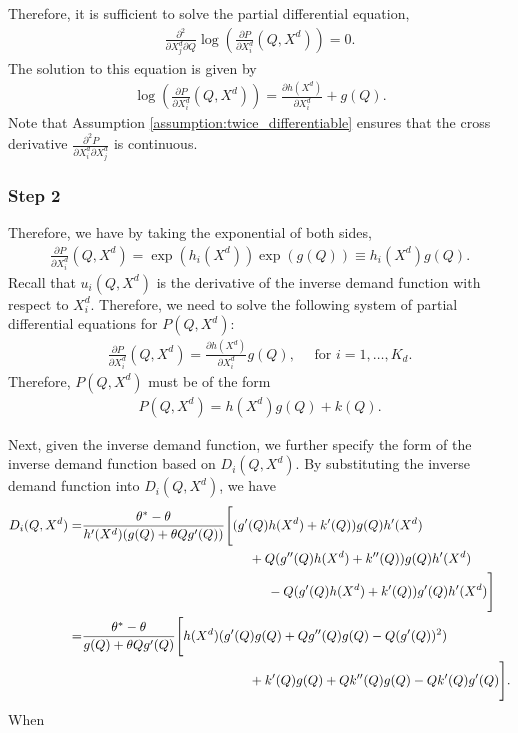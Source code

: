 \documentclass[11pt, a4paper]{article}
\theoremstyle{remark}
\begin{document}
Therefore, it is sufficient to solve the partial differential equation,
\begin{align}
    \frac{\partial^2 }{\partial X^{d}_j \partial Q}\log \left(\frac{\partial P}{\partial X^{d}_i}(Q, X^{d})\right) = 0.
\end{align}
The solution to this equation is given by
\begin{align}
    \log \left(\frac{\partial P}{\partial X^{d}_i}(Q, X^{d})\right) = \frac{\partial h(X^{d})}{\partial X^{d}_i}+ g(Q).
\end{align}
Note that Assumption \ref{assumption:twice_differentiable} ensures that the cross derivative $\frac{\partial^2 P}{\partial X^{d}_i \partial X^{d}_j}$ is continuous.



\subsubsection*{Step 2}

Therefore, we have by taking the exponential of both sides,
\begin{align}
    \frac{\partial P}{\partial X^{d}_i}(Q, X^{d}) = \exp(h_i(X^{d})) \exp(g(Q)) \equiv h_i(X^{d}) g(Q).
\end{align}
Recall that $u_i(Q, X^{d})$ is the derivative of the inverse demand function with respect to $X^{d}_i$.
Therefore, we need to solve the following system of partial differential equations for $P(Q, X^{d})$:
\begin{align}
    \frac{\partial P}{\partial X^{d}_i}(Q, X^{d}) = \frac{\partial h(X^{d})}{\partial X^{d}_i} g(Q), \quad \text{ for } i = 1, \ldots, K_d.
\end{align}
Therefore, $P(Q, X^{d})$ must be of the form
\begin{align}
    P(Q, X^{d}) = h(X^{d})g(Q) + k(Q).
\end{align}

Next, given the inverse demand function, we further specify the form of the inverse demand function based on $D_i(Q, X^{d})$.
By substituting the inverse demand function into $D_i(Q, X^{d})$, we have
\begin{align}
    D_i(Q, X^{d}) = &\frac{\theta^{*} - \theta}{h'(X^{d})(g(Q) + \theta Q g'(Q))}\Bigg[
    (g'(Q)h(X^{d}) + k'(Q) )g(Q)h'(X^{d})\\
    & \hspace{4.5cm} + Q(g''(Q)h(X^{d}) + k''(Q))g(Q)h'(X^{d}) \\
    &\hspace{5cm} - Q(g'(Q)h(X^{d}) + k'(Q))g'(Q)h'(X^{d})\Bigg]\\
    =&  \frac{\theta^{*} - \theta}{g(Q) + \theta Q g'(Q)}\Bigg[h(X^{d})(g'(Q)g(Q) + Qg{''}(Q)g(Q) - Q (g'(Q))^{2})\\
    & \hspace{4.5cm} + k'(Q)g(Q) + Qk''(Q)g(Q) - Qk'(Q)g'(Q)\Bigg].
\end{align}
When
\end{document}
